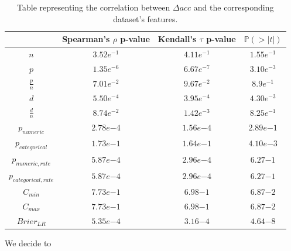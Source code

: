 \documentclass[12pt]{article}
\begin{document}
\begin{table}[h]
   \begin{tabular}{| c | c | c | c |}
     \hline
		 & Spearman's $\rho$  p-value & Kendall's $\tau$ p-value & $\mathbb{P}(>|t|)$ \\ \hline
     $n$  & $3.52e^{-1}$ & $4.11e^{-1}$ &  $1.55e^{-1}$  \\ \hline
     $p$  & $1.35e^{-6}$  & $ 6.67e^{-7}$ & $3.10e^{-3}$  \\ \hline
     $\frac{p}{n}$  & $7.01e^{-2}$ & $9.67e^{-2}$ & $8.9e^{-1}$  \\ \hline
     $d$  & $5.50e^{-4}$ & $3.95e^{-4}$ &$ 4.30e^{-3}$  \\ \hline
     $\frac{d}{n}$ & $8.74e^{-2}$ & $1.42e^{-3}$ & $8.25e^{-1}$  \\ \hline
     $p_{numeric}$  & $2.78e{-4}$ & $1.56e{-4}$ & $2.89e{-1}$  \\ \hline
     $p_{categorical}$  & $1.73e{-1}$ & $1.64e{-1}$ & $4.10e{-3}$  \\ \hline
		 $p_{numeric,rate}$  & $5.87e{-4}$ & $2.96e{-4}$ & $6.27{-1}$  \\ \hline
     $p_{categorical,rate}$  & $5.87e{-4}$ & $2.96e{-4}$ & $6.27{-1}$  \\ \hline
     $C_{min}$ & $7.73e{-1}$ & $6.98{-1}$ & $6.87{-2}$  \\ \hline
     $C_{max}$ & $7.73e{-1}$ & $6.98{-1}$ & $6.87{-2}$  \\ \hline
     $Brier_{LR}$ & $5.35e{-4}$ & $3.16{-4}$ & $4.64{-8}$ \\ \hline

   \end{tabular}
	\caption{Table representing the correlation between $\Delta acc$ and the corresponding dataset's features.}
  \label{table:correlation}
\end{table}

We decide to 
\end{document}
